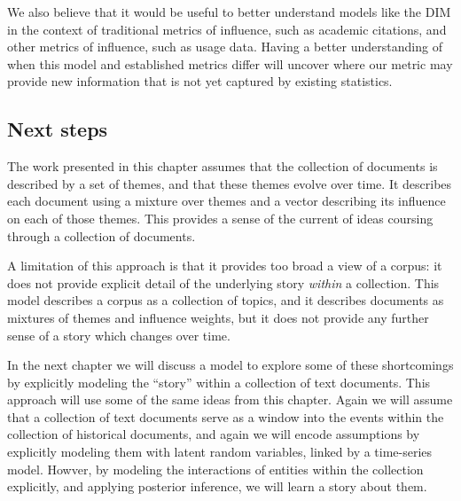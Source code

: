 We also believe that it would be useful to better understand models like
the DIM in the context of traditional metrics of influence, such as
academic citations, and other metrics of influence, such as usage
data.  Having a better understanding of when this model and
established metrics differ will uncover where our metric may provide
new information that is not yet captured by existing statistics.

\subsection{Next steps}
The work presented in this chapter assumes that the collection of
documents is described by a set of themes, and that these themes
evolve over time.  It describes each document using a mixture over
themes and a vector describing its influence on each of those themes.
This provides a sense of the current of ideas coursing through a
collection of documents.

A limitation of this approach is that it provides too broad a view of
a corpus: it does not provide explicit detail of the underlying story
\emph{within} a collection.  This model describes a corpus as a
collection of topics, and it describes documents as mixtures of themes
and influence weights, but it does not provide any further sense of a
story which changes over time.

In the next chapter we will discuss a model to explore some of these
shortcomings by explicitly modeling the ``story'' within a collection
of text documents.  This approach will use some of the same ideas from
this chapter.  Again we will assume that a collection of text
documents serve as a window into the events within the collection of
historical documents, and again we will encode assumptions by
explicitly modeling them with latent random variables, linked by a
time-series model.  Howver, by modeling the interactions of entities
within the collection explicitly, and applying posterior inference, we
will learn a story about them.

